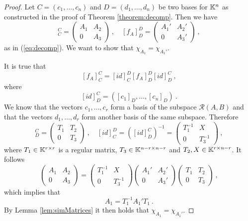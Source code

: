 \begin{proof}
	Let $C=(c_1,\ldots,c_n)$ and $D=(d_1,\ldots,d_n)$ be two bases for $\mathbb{K}^n$ as constructed in the proof of Theorem \ref{theorem:decomp}. Then we have 
	\begin{equation*}
		[f_A]^C_C=
		\begin{pmatrix}
			A_1 & A_2 \\
			0   & A_3
		\end{pmatrix}\ ,
		\quad
		[f_A]^D_D=
		\begin{pmatrix}
			A_1' & A_2' \\
			0    & A_3'
		\end{pmatrix}\ ,
	\end{equation*}
	as in (\ref{eq:decomp}).
	We want to show that $\chi_{A_1}=\chi_{A_1'}$.

	It is true that
	$$[f_A]^C_C=[id]^D_C[f_A]^D_D[id]^C_D\ ,$$
	where
	$$[id]^C_D=([c_1]_D,\ldots,[c_n]_D)\ .$$
	We know that the vectors $c_1,\ldots,c_r$ form a basis of the subspace $\mathcal{R}(A,B)$ and that the vectors $d_1,\ldots,d_r$ form another basis of the same subspace. Therefore
	\begin{equation*}
		[id]^C_D=
		\begin{pmatrix}
			T_1 & T_2 \\
			0   & T_3
		\end{pmatrix}\ ,
		\quad
		[id]^D_C=([id]^C_D)^{-1}=
		\begin{pmatrix}
			T_1^{-1} & X \\
			0        & T_3^{-1}
		\end{pmatrix}\ ,
	\end{equation*}
	where $T_1\in\mathbb{K}^{r\times r}$ is a regular matrix, $T_3\in\mathbb{K}^{n-r\times n-r}$ and $T_2,X\in\mathbb{K}^{r\times n-r}$. It follows 
	\begin{equation*}
		\begin{pmatrix}
			A_1 & A_2 \\
			0   & A_3
		\end{pmatrix}
		=
		\begin{pmatrix}
			T_1^{-1} & X \\
			0        & T_3^{-1}
		\end{pmatrix}
		\begin{pmatrix}
			A_1' & A_2' \\
			0    & A_3'
		\end{pmatrix}
		\begin{pmatrix}
			T_1 & T_2 \\
			0   & T_3
		\end{pmatrix}\ ,
	\end{equation*}
	which implies that
	$$A_1=T_1^{-1}A_1'T_1\ .$$
	By Lemma \ref{lem:simMatrices} it then holds that $\chi_{A_1}=\chi_{A_1'}$.
\end{proof}